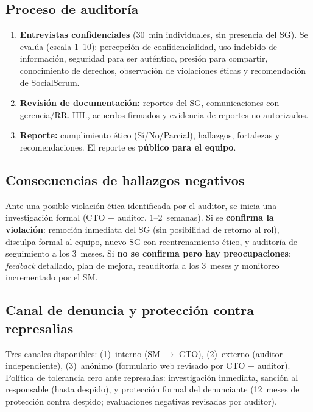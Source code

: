 \subsection{Proceso de auditoría}

\begin{enumerate}[nosep]
    \item \textbf{Entrevistas confidenciales} (30~min individuales, sin presencia del SG). Se evalúa (escala 1--10): percepción de confidencialidad, uso indebido de información, seguridad para ser auténtico, presión para compartir, conocimiento de derechos, observación de violaciones éticas y recomendación de SocialScrum.
    \item \textbf{Revisión de documentación:} reportes del SG, comunicaciones con gerencia/RR. HH., acuerdos firmados y evidencia de reportes no autorizados.
    \item \textbf{Reporte:} cumplimiento ético (Sí/No/Parcial), hallazgos, fortalezas y recomendaciones. El reporte es \textbf{público para el equipo}.
\end{enumerate}

\subsection{Consecuencias de hallazgos negativos}

Ante una posible violación ética identificada por el auditor, se inicia una investigación formal (CTO + auditor, 1--2~semanas). Si se \textbf{confirma la violación}: remoción inmediata del SG (sin posibilidad de retorno al rol), disculpa formal al equipo, nuevo SG con reentrenamiento ético, y auditoría de seguimiento a los 3~meses. Si \textbf{no se confirma pero hay preocupaciones}: \textit{feedback} detallado, plan de mejora, reauditoría a los 3~meses y monitoreo incrementado por el SM.

\subsection{Canal de denuncia y protección contra represalias}

Tres canales disponibles: (1)~interno (SM $\rightarrow$ CTO), (2)~externo (auditor independiente), (3)~anónimo (formulario web revisado por CTO + auditor). Política de tolerancia cero ante represalias: investigación inmediata, sanción al responsable (hasta despido), y protección formal del denunciante (12~meses de protección contra despido; evaluaciones negativas revisadas por auditor).

